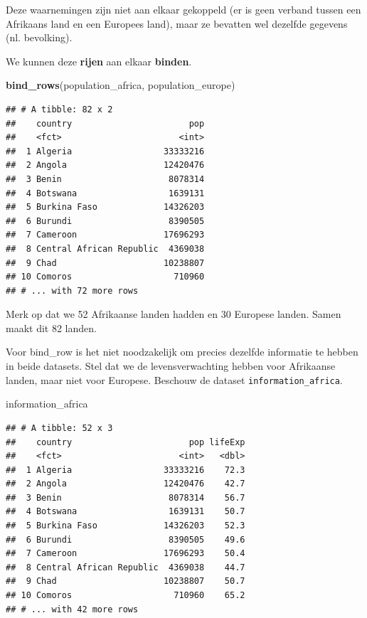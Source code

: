 \documentclass[]{tufte-book}
\newenvironment{Shaded}{}{}
\newcommand{\KeywordTok}[1]{\textcolor[rgb]{0.00,0.44,0.13}{\textbf{#1}}}
\newcommand{\NormalTok}[1]{#1}
\begin{document}
Deze waarnemingen zijn niet aan elkaar gekoppeld (er is geen verband tussen een Afrikaans land en een Europees land), maar ze bevatten wel dezelfde gegevens (nl. bevolking).

We kunnen deze \textbf{rijen} aan elkaar \textbf{binden}.

\begin{Shaded}
\begin{Highlighting}[]
\KeywordTok{bind_rows}\NormalTok{(population_africa, population_europe)}
\end{Highlighting}
\end{Shaded}

\begin{verbatim}
## # A tibble: 82 x 2
##    country                       pop
##    <fct>                       <int>
##  1 Algeria                  33333216
##  2 Angola                   12420476
##  3 Benin                     8078314
##  4 Botswana                  1639131
##  5 Burkina Faso             14326203
##  6 Burundi                   8390505
##  7 Cameroon                 17696293
##  8 Central African Republic  4369038
##  9 Chad                     10238807
## 10 Comoros                    710960
## # ... with 72 more rows
\end{verbatim}

Merk op dat we 52 Afrikaanse landen hadden en 30 Europese landen. Samen maakt dit 82 landen.

Voor bind\_row is het niet noodzakelijk om precies dezelfde informatie te hebben in beide datasets. Stel dat we de levensverwachting hebben voor Afrikaanse landen, maar niet voor Europese. Beschouw de dataset \texttt{information\_africa}.

\begin{Shaded}
\begin{Highlighting}[]
\NormalTok{information_africa }
\end{Highlighting}
\end{Shaded}

\begin{verbatim}
## # A tibble: 52 x 3
##    country                       pop lifeExp
##    <fct>                       <int>   <dbl>
##  1 Algeria                  33333216    72.3
##  2 Angola                   12420476    42.7
##  3 Benin                     8078314    56.7
##  4 Botswana                  1639131    50.7
##  5 Burkina Faso             14326203    52.3
##  6 Burundi                   8390505    49.6
##  7 Cameroon                 17696293    50.4
##  8 Central African Republic  4369038    44.7
##  9 Chad                     10238807    50.7
## 10 Comoros                    710960    65.2
## # ... with 42 more rows
\end{verbatim}
\end{document}
